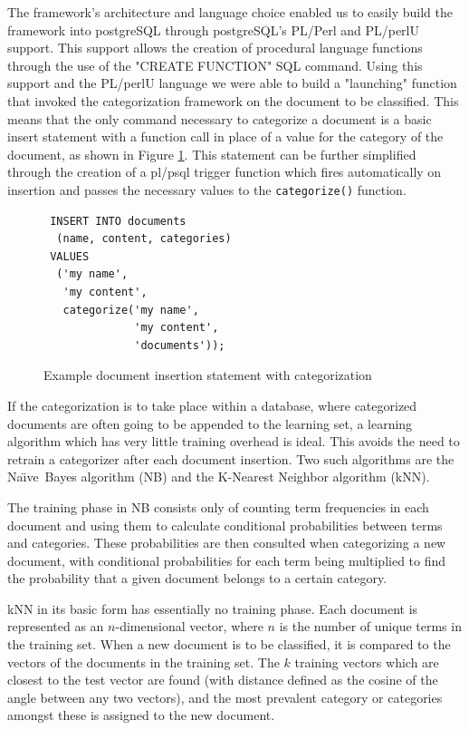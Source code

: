 \documentclass{ios}
\newcommand{\naive}{Na\"\i ve}
\newcommand{\method}[1]{\texttt{#1()}}
\begin{document}
The framework's architecture and language choice enabled us to easily build the 
framework into postgreSQL through postgreSQL's PL/Perl and PL/perlU support. 
This support allows the creation of procedural language functions through the use of 
the "CREATE FUNCTION" SQL command. Using this support and the PL/perlU language 
we were able to build a "launching" function that invoked the categorization 
framework on the document to be classified. This means that the only command 
necessary to categorize a document is a basic insert statement with a function call in 
place of a value for the category of the document, as shown in Figure \ref{sql-insert}.
This statement can be further simplified through the creation of a pl/psql 
trigger function which fires automatically on insertion and passes the necessary values 
to the \method{categorize} function.

\begin{figure}
\begin{verbatim}
 INSERT INTO documents
  (name, content, categories) 
 VALUES
  ('my name',
   'my content',
   categorize('my name',
              'my content',
              'documents'));
\end{verbatim}
\caption{Example document insertion statement with categorization}
\label{sql-insert}
\end{figure}

If the categorization is to take place within a database, where
categorized documents are often going to be appended to the learning
set, a learning algorithm which has very little training overhead is
ideal.  This avoids the need to retrain a categorizer after each
document insertion.  Two such algorithms are the \naive\ Bayes
algorithm (NB) and the K-Nearest Neighbor algorithm (kNN).

The training phase in NB consists only of counting term frequencies in
each document and using them to calculate conditional probabilities
between terms and categories.  These probabilities are then consulted
when categorizing a new document, with conditional probabilities for
each term being multiplied to find the probability that a given
document belongs to a certain category.

kNN in its basic form has essentially no training phase.  Each
document is represented as an $n$-dimensional vector, where $n$ is the
number of unique terms in the training set.  When a new document is to
be classified, it is compared to the vectors of the documents in the
training set. The $k$ training vectors which are closest to the test
vector are found (with distance defined as the cosine of the angle
between any two vectors), and the most prevalent category or
categories amongst these is assigned to the new document.
\end{document}
